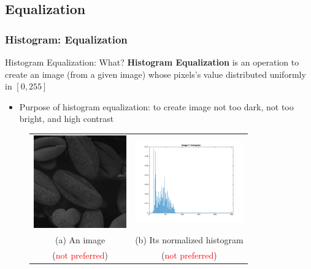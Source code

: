 \documentclass[english,11pt,table,handout]{beamer}
\begin{document}
\subsection{Equalization}
\begin{frame}[fragile]
\frametitle{Histogram: Equalization}
\begin{block}{Histogram Equalization: What?}
	\textbf{Histogram Equalization} is an operation to create an image (from a given image) whose pixels's value distributed uniformly in $[0,255]$
	\begin{itemize}
		\item Purpose of histogram equalization: to create image not too dark, not too bright, and high contrast
	\end{itemize}
\end{block}
\begin{figure}[!h]
	\begin{table}
		\begin{tabular}{cc}
			\includegraphics[height=4cm]{./images/bean1.jpg} &
			\includegraphics[height=3.5cm]{./images/histogram1_norm.png} \\
			(a) An image  & (b) Its normalized histogram \\
			(\textcolor{red}{not preferred}) & (\textcolor{red}{not preferred})
		\end{tabular}
	\end{table}
\end{figure}
\end{frame}
\end{document}
